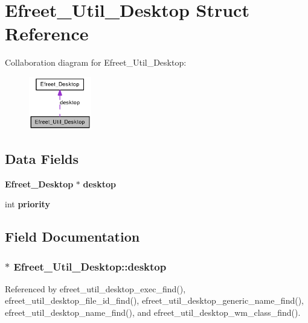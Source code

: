 \section{Efreet\_\-Util\_\-Desktop Struct Reference}
\label{structEfreet__Util__Desktop}
Collaboration diagram for Efreet\_\-Util\_\-Desktop:\nopagebreak
\begin{figure}[H]
\begin{center}
\leavevmode
\includegraphics[width=77pt]{structEfreet__Util__Desktop__coll__graph}
\end{center}
\end{figure}
\subsection*{Data Fields}
\begin{CompactItemize}
\item 
{\bf Efreet\_\-Desktop} $\ast$ {\bf desktop}
\item 
int {\bf priority}
\end{CompactItemize}


\subsection{Field Documentation}
\subsubsection[desktop]{$\ast$ {\bf Efreet\_\-Util\_\-Desktop::desktop}}\label{structEfreet__Util__Desktop_c89100418cd57d747e6d1e72e7a9db47}




Referenced by efreet\_\-util\_\-desktop\_\-exec\_\-find(), efreet\_\-util\_\-desktop\_\-file\_\-id\_\-find(), efreet\_\-util\_\-desktop\_\-generic\_\-name\_\-find(), efreet\_\-util\_\-desktop\_\-name\_\-find(), and efreet\_\-util\_\-desktop\_\-wm\_\-class\_\-find().
